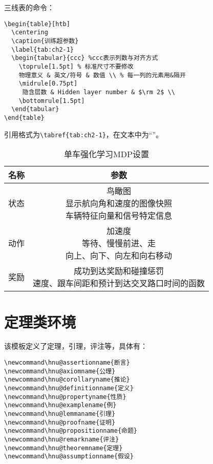 ~\\
~\\
三线表的命令：
\begin{lstlisting}
\begin{table}[htb]
  \centering
  \caption{训练超参数}
  \label{tab:ch2-1}
  \begin{tabular}{ccc} %ccc表示列数与对齐方式
	\toprule[1.5pt] % 标准尺寸不要修改
	物理意义 & 英文/符号 & 数值 \\ % 每一列的元素用&隔开
	\midrule[0.75pt]
	 隐含层数 & Hidden layer number & $\rm 2$ \\
	\bottomrule[1.5pt]
  \end{tabular}
\end{table}
\end{lstlisting}

引用格式为\lstinline!\tabref{tab:ch2-1}!，在文本中为“”。
\begin{table}[htb]
  \centering
  \caption{单车强化学习MDP设置}
  \label{tab:ch2-1}
  \begin{tabular}{cc}
	\toprule[1.5pt]
	名称 & 参数  \\ 
	\midrule[0.75pt]
	状态 & \makecell{鸟瞰图 \\ 显示航向角和速度的图像快照 \\ 车辆特征向量和信号特定信息} \\
	动作 &  \makecell{加速度 \\ 等待、慢慢前进、走 \\ 向上、向下、向左和向右移动} \\
	奖励 & \makecell{成功到达奖励和碰撞惩罚 \\ 速度、跟车间距和预计到达交叉路口时间的函数} \\
	\bottomrule[1.5pt]
  \end{tabular}
\end{table}

\section{定理类环境}
该模板定义了定理，引理，评注等，具体有：
\begin{lstlisting}
\newcommand\hnu@assertionname{断言}
\newcommand\hnu@axiomname{公理}
\newcommand\hnu@corollaryname{推论}
\newcommand\hnu@definitionname{定义}
\newcommand\hnu@propertyname{性质}
\newcommand\hnu@examplename{例}
\newcommand\hnu@lemmaname{引理}
\newcommand\hnu@proofname{证明}
\newcommand\hnu@propositionname{命题}
\newcommand\hnu@remarkname{评注}
\newcommand\hnu@theoremname{定理}
\newcommand\hnu@assumptionname{假设}
\end{lstlisting}

